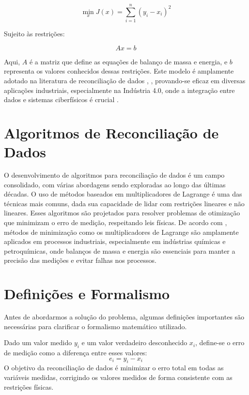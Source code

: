 \begin{equation}
\min_x J(x) = \sum_{i=1}^{n} (y_i - x_i)^2
\end{equation}

Sujeito às restrições:

\begin{equation}
Ax = b
\end{equation}

Aqui, $A$ é a matriz que define as equações de balanço de massa e energia, e $b$ representa os valores conhecidos dessas restrições. Este modelo é amplamente adotado na literatura de reconciliação de dados \cite{lagrangeopt}, \cite{processbalancing}, provando-se eficaz em diversas aplicações industriais, especialmente na Indústria 4.0, onde a integração entre dados e sistemas ciberfísicos é crucial \cite{cyberphysicalsystems}.

\section{Algoritmos de Reconciliação de Dados}
\label{Sec:AlgoritmosReconciliacao}

O desenvolvimento de algoritmos para reconciliação de dados é um campo consolidado, com várias abordagens sendo exploradas ao longo das últimas décadas. O uso de métodos baseados em multiplicadores de Lagrange é uma das técnicas mais comuns, dada sua capacidade de lidar com restrições lineares e não lineares. Esses algoritmos são projetados para resolver problemas de otimização que minimizam o erro de medição, respeitando leis físicas. De acordo com \cite{reconciliationalgorithms}, métodos de minimização como os multiplicadores de Lagrange são amplamente aplicados em processos industriais, especialmente em indústrias químicas e petroquímicas, onde balanços de massa e energia são essenciais para manter a precisão das medições e evitar falhas nos processos.

\section{Definições e Formalismo}
\label{Sec:DefinicoesFormalismo}

Antes de abordarmos a solução do problema, algumas definições importantes são necessárias para clarificar o formalismo matemático utilizado.

\begin{definicao}
Dado um valor medido $y_i$ e um valor verdadeiro desconhecido $x_i$, define-se o erro de medição como a diferença entre esses valores:
\[
e_i = y_i - x_i
\]
O objetivo da reconciliação de dados é minimizar o erro total em todas as variáveis medidas, corrigindo os valores medidos de forma consistente com as restrições físicas.
\end{definicao}

